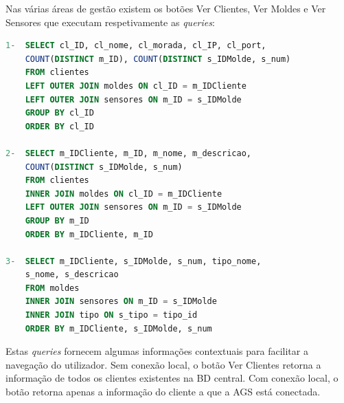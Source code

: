 \documentclass[11pt,twoside,a4paper]{report}
\begin{document}
Nas várias áreas de gestão existem os botões Ver Clientes, Ver Moldes e Ver Sensores que executam respetivamente as \textit{queries}:
\begin{lstlisting}[language = SQL]
1-	SELECT cl_ID, cl_nome, cl_morada, cl_IP, cl_port,
	COUNT(DISTINCT m_ID), COUNT(DISTINCT s_IDMolde, s_num)
	FROM clientes
	LEFT OUTER JOIN moldes ON cl_ID = m_IDCliente
	LEFT OUTER JOIN sensores ON m_ID = s_IDMolde
	GROUP BY cl_ID
	ORDER BY cl_ID
	
2-	SELECT m_IDCliente, m_ID, m_nome, m_descricao,
	COUNT(DISTINCT s_IDMolde, s_num)
	FROM clientes
	INNER JOIN moldes ON cl_ID = m_IDCliente
	LEFT OUTER JOIN sensores ON m_ID = s_IDMolde
	GROUP BY m_ID
	ORDER BY m_IDCliente, m_ID
	
3-	SELECT m_IDCliente, s_IDMolde, s_num, tipo_nome,
	s_nome, s_descricao
	FROM moldes
	INNER JOIN sensores ON m_ID = s_IDMolde
	INNER JOIN tipo ON s_tipo = tipo_id
	ORDER BY m_IDCliente, s_IDMolde, s_num
\end{lstlisting}
Estas \textit{queries} fornecem algumas informações contextuais para facilitar a navegação do utilizador. Sem conexão local, o botão Ver Clientes retorna a informação de todos os clientes existentes na BD central. Com conexão local, o botão retorna apenas a informação do cliente a que a AGS está conectada.
\end{document}
